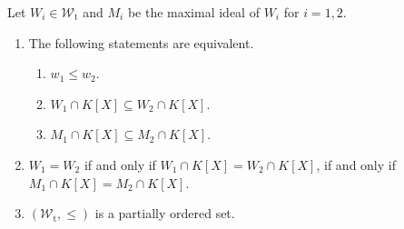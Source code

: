 \documentclass[10pt,a4paper]{amsart}
\renewcommand{\t}{\text{t}}
\begin{document}
\begin{Lem}\label{ordering}
Let $W_i \in \mathcal W_{\t}$ and $M_i$ be the maximal ideal of $W_i$ for $i=1,2$.
\begin{enumerate}
\item[{\em (1)}] The following statements are equivalent.
\begin{enumerate}
\item[{\em (a)}] $w_1\leq w_2$.
\item[{\em (b)}] $W_1\cap K[X]\subseteq W_2\cap K[X].$ 
\item[{\em (c)}] $M_1\cap K[X]\subseteq M_2\cap K[X]$.
\end{enumerate}
\item[{\em (2)}] $W_1=W_2$ if and only if $W_1\cap K[X]=W_2\cap K[X]$, if and only if $M_1\cap K[X] = M_2\cap K[X]$. 
\item[{\em (3)}] $(\mathcal W_{\t}, \leq)$ is a partially ordered set.
\end{enumerate}
\end{Lem} 
\end{document}
